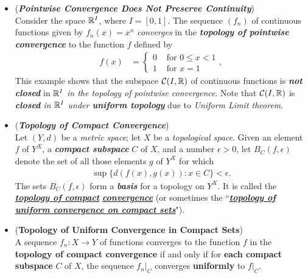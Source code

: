 \documentclass[11pt]{article}
\begin{document}
\begin{itemize}
\item \begin{example} (\textbf{\emph{Pointwise Convergence Does Not Preserve Continuity}})\\
Consider the space ${\mathbb R}^I$, where $I = [0, 1]$. The sequence $(f_n)$ of continuous functions given by $f_n(x) = x^n$ \emph{converges} in the \emph{\textbf{topology of pointwise convergence}} to the function $f$ defined by
\begin{align*}
f(x) &=\left\{ 
\begin{array}{cc}
0 &\text{ for } 0 \le x < 1\\
1 &\text{ for } x = 1
\end{array}\right.,
\end{align*}
This example shows that the subspace ${\mathcal C}(I, {\mathbb R})$ of continuous functions is \emph{\textbf{not closed}} in ${\mathbb R}^I$
\emph{in the topology of pointwise convergence}. Note that ${\mathcal C}(I, {\mathbb R})$  is \emph{\textbf{closed} in ${\mathbb R}^I$ under \textbf{uniform topology}} due to \emph{Uniform Limit theorem}. 
\end{example}

\item \begin{definition} (\emph{\textbf{Topology of Compact Convergence}})\\
Let $(Y, d)$ be a \emph{metric space}; let $X$ be a \emph{topological space}. Given an element $f$ of $Y^X$, a \emph{\textbf{compact subspace}} $C$ of $X$, and a number $\epsilon > 0$, let $B_{C}(f, \epsilon)$ denote the set of all those elements $g$ of $Y^X$ for which
\begin{align*}
\sup\{d(f (x), g(x)): x \in C\} < \epsilon.
\end{align*}
The sets $B_{C}(f, \epsilon)$  form a \emph{\textbf{basis}} for a topology on $Y^X$. It is called the \underline{\emph{\textbf{topology of compact}}} \underline{\emph{\textbf{convergence}}} (or sometimes the ``\underline{\emph{\textbf{topology of uniform convergence on compact sets}}}").
\end{definition}

\item \begin{proposition} (\textbf{Topology of Uniform Convergence in Compact Sets}) \citep{munkres2000topology}\\
A sequence $f_n : X \rightarrow Y$ of functions converges to the function $f$ in the \textbf{topology of compact convergence} if and only if for \textbf{each compact subspace} $C$ of $X$, the sequence $f_n|_{C}$ converges \textbf{uniformly} to $f|_C$.
\end{proposition}


\end{itemize}
\end{document}
